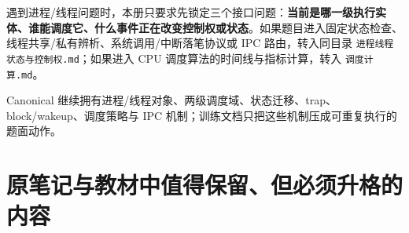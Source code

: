 \documentclass[11pt,a4paper]{ctexart}
\newcommand{\kw}[1]{\textbf{#1}}
\begin{document}
遇到进程/线程问题时，本册只要求先锁定三个接口问题：\kw{当前是哪一级执行实体、谁能调度它、什么事件正在改变控制权或状态}。如果题目进入固定状态检查、线程共享/私有辨析、系统调用/中断落笔协议或 IPC 路由，转入同目录 \texttt{进程线程状态与控制权.md}；如果进入 CPU 调度算法的时间线与指标计算，转入 \texttt{调度计算.md}。

Canonical 继续拥有进程/线程对象、两级调度域、状态迁移、trap、block/wakeup、调度策略与 IPC 机制；训练文档只把这些机制压成可重复执行的题面动作。

\section{原笔记与教材中值得保留、但必须升格的内容}

\begingroup
\small
\renewcommand{\arraystretch}{1.22}
\setlength{\tabcolsep}{4pt}
\end{document}
